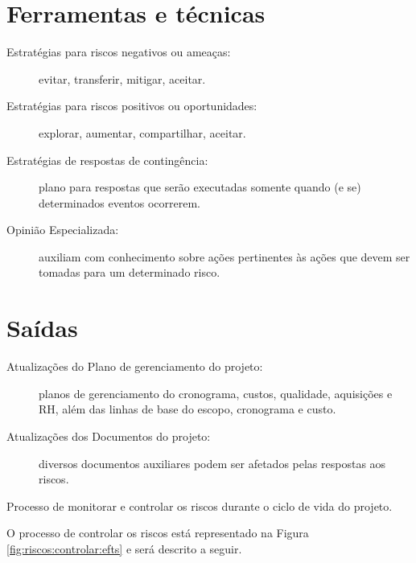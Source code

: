 \section{Ferramentas e técnicas}

\begin{description}
	
	\item[Estratégias para riscos negativos ou ameaças:] evitar, transferir, mitigar, aceitar.
	
	\item[Estratégias para riscos positivos ou oportunidades:] explorar, aumentar, compartilhar, aceitar.
	
	\item[Estratégias de respostas de contingência:] plano para respostas que serão executadas somente quando (e se) determinados eventos ocorrerem.
	
	\item[Opinião Especializada:] auxiliam com conhecimento sobre ações pertinentes às ações que devem ser tomadas para um determinado risco.
	
\end{description}

\section{Saídas}

\begin{description}
	
	\item[Atualizações do Plano de gerenciamento do projeto:] planos de gerenciamento do cronograma, custos, qualidade, aquisições e RH, além das linhas de base do escopo, cronograma e custo.
	
	\item[Atualizações dos Documentos do projeto:] diversos documentos auxiliares podem ser afetados pelas respostas aos riscos.	
	
\end{description}



Processo de monitorar e controlar os riscos durante o ciclo de vida do projeto.

O processo de controlar os riscos está representado na Figura \ref{fig:riscos:controlar:efts} e será descrito a seguir.

